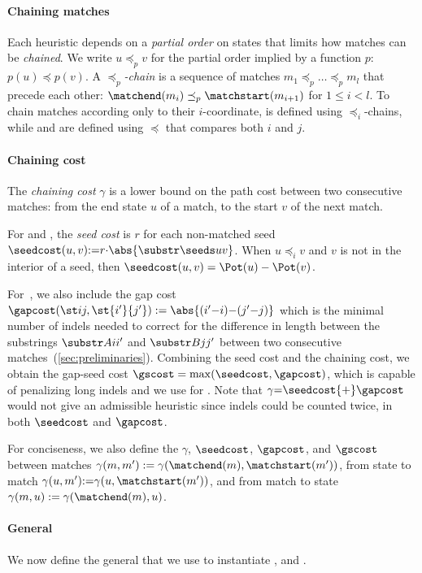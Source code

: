 \paragraph{Chaining matches}
Each heuristic depends on a \emph{partial order} on states that limits
how matches can be \emph{chained}. We write $u\preceq_p v$
for the partial order implied by a function $p$: ${p(u) \preceq p(v)}$. A
\emph{$\preceq_p$-chain} is a sequence of matches ${m_1 \preceq_p \dots
\preceq_p m_l}$ that precede each other: ${\matchend(m_i) \preceq_p
\matchstart(m_{i+1})}$ for $1\leq i < l$. To chain matches according
only to their $i$-coordinate, \SH is defined using $\preceq_i$-chains, while \CSH
and \GCH are defined using $\preceq$ that compares both $i$ and $j$.

\paragraph{Chaining cost}
The \emph{chaining cost} $\gamma$ is a lower bound on the path cost between two
consecutive matches: from the end state $u$ of a match, to the start $v$ of the
next match.

For \SH and \CSH, the \emph{seed cost} is $r$ for each non-matched seed
${\seedcost(u,v) {:=} r{\cdot} \abs{\substr\seeds uv}}$. When $u\preceq_i v$ and $v$
is not in the interior of a seed, then ${\seedcost(u, v) = \Pot(u) - \Pot(v)}$.

For~\GCH, we also include the gap cost $\gapcost(\st ij,
\st{i'}{j'}):=\abs{(i'{-}i) {-} (j'{-}j)}$ which is the minimal number of indels
needed to correct for the difference in length between the substrings $\substr
Ai{i'}$ and $\substr Bj{j'}$ between two consecutive
matches~(\cref{sec:preliminaries}). Combining the seed cost and the chaining
cost, we obtain the gap-seed cost ${\gscost=\max(\seedcost, \gapcost)}$, which
is capable of penalizing long indels and we use for \GCH.
Note that $\gamma{=}\seedcost{+}\gapcost$ would not give an admissible heuristic
since indels could be counted twice, in both $\seedcost$ and $\gapcost$.

For conciseness, we also define the $\gamma$, $\seedcost$, $\gapcost$, and $\gscost$ between
matches ${\gamma(m, m') := \gamma(\matchend(m), \matchstart(m'))}$, from
state to match ${\gamma(u, m') {:=} \gamma(u, \matchstart(m'))}$, and from
match to state ${\gamma(m, u) := \gamma(\matchend(m),u)}$.

\paragraph{General \csh}
We now define the general \csh that we use to instantiate \SH, \CSH and \GCH.

